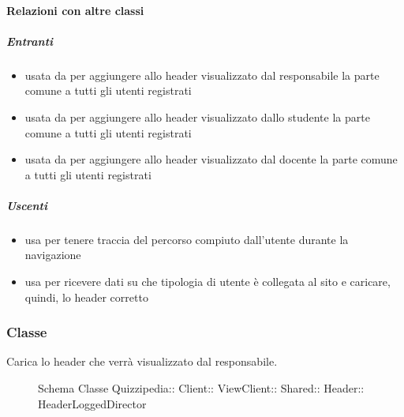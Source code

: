 \paragraph{Relazioni con altre classi}
\subparagraph{Entranti}
\begin{itemize}
\item usata da  per aggiungere allo header visualizzato dal responsabile la parte comune a tutti gli utenti registrati
\item usata da  per aggiungere allo header visualizzato dallo studente la parte comune a tutti gli utenti registrati
\item usata da  per aggiungere allo header visualizzato dal docente la parte comune a tutti gli utenti registrati
\end{itemize}
\subparagraph{Uscenti}
\begin{itemize}
\item usa  per tenere traccia del percorso compiuto dall'utente durante la navigazione
\item usa  per ricevere dati su che tipologia di utente è collegata al sito e caricare, quindi, lo header corretto
\end{itemize}
\subsubsection{Classe }
Carica lo header che verrà visualizzato dal responsabile.
\begin{figure}[H]
\centering
\noindent{}
\caption[Schema Classe HeaderLoggedDirector]{Schema Classe Quizzipedia:: Client:: ViewClient:: Shared:: Header:: HeaderLoggedDirector}
\end{figure}
